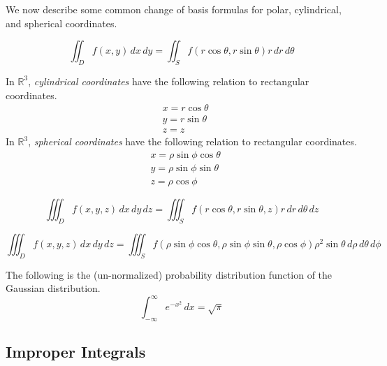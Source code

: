   We now describe some common change of basis formulas for polar, cylindrical, and spherical coordinates. 

  \begin{theorem}
  \[\iint_{D} f(x, y) \, dx \,dy = \iint_S f(r \cos{\theta}, r \sin{\theta}) r \, dr \, d\theta\]
  \end{theorem}

  \begin{definition}
  In $\mathbb{R}^3$, \textit{cylindrical coordinates} have the following relation to rectangular coordinates. 
  \begin{align*}
      & x = r \cos{\theta} \\
      & y = r \sin{\theta} \\
      & z = z
  \end{align*}
  In $\mathbb{R}^3$, \textit{spherical coordinates} have the following relation to rectangular coordinates. 
  \begin{align*}
      & x = \rho \sin{\phi} \cos{\theta} \\
      & y = \rho \sin{\phi} \sin{\theta} \\
      & z = \rho \cos{\phi}
  \end{align*}
  \end{definition}

  \begin{corollary}
  \[\iiint_D f(x, y, z) \, dx \, dy \, dz = \iiint_S f( r \cos{\theta}, r \sin{\theta}, z) r \, dr \, d\theta \, dz\]
  \end{corollary}

  \begin{corollary}
  \[\iiint_D f(x, y, z) \,dx\,dy\,dz = \iiint_S f(\rho \sin{\phi} \cos{\theta}, \rho \sin{\phi} \sin{\theta}, \rho \cos{\phi}) \rho^2 \sin{\theta} \, d\rho \, d\theta \, d\phi\]
  \end{corollary}

  \begin{example}
  The following is the (un-normalized) probability distribution function of the Gaussian distribution. 
  \[\int_{-\infty}^{\infty} e^{-x^2} \, dx = \sqrt{\pi}\]
  \end{example}

\subsection{Improper Integrals}

